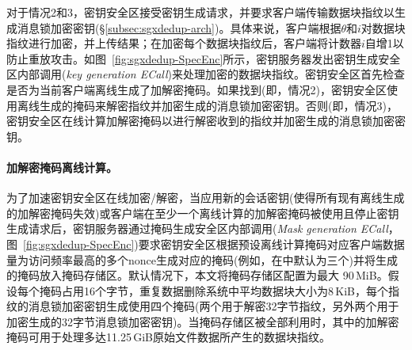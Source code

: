 对于情况2和3，密钥安全区接受密钥生成请求，并要求客户端传输数据块指纹以生成消息锁加密密钥(\S\ref{subsec:sgxdedup-arch})。具体来说，客户端根据$\theta$和$i$对数据块指纹进行加密，并上​​传结果；在加密每个数据块指纹后，客户端将计数器$i$自增1以防止重放攻击。如图~\ref{fig:sgxdedup-SpecEnc}所示，密钥服务器发出密钥生成安全区内部调用(\textit{key generation ECall})来处理加密的数据块指纹。密钥安全区首先检查是否为当前客户端离线生成了加解密掩码。如果找到(即，情况2)，密钥安全区使用离线生成的掩码来解密指纹并加密生成的消息锁加密密钥。否则(即，情况3)，密钥安全区在线计算加解密掩码以进行解密收到的指纹并加密生成的消息锁加密密钥。

\paragraph*{加解密掩码离线计算。}为了加速密钥安全区在线加密/解密，当应用新的会话密钥(使得所有现有离线生成的加解密掩码失效)或客户端在至少一个离线计算的加解密掩码被使用且停止密钥生成请求后，密钥服务器通过掩码生成安全区内部调用(\textit{Mask generation ECall}，图~\ref{fig:sgxdedup-SpecEnc})要求密钥安全区根据预设离线计算掩码对应客户端数据量为访问频率最高的多个nonce生成对应的掩码(例如，在\sysnameS 中默认为三个)并将生成的掩码放入掩码存储区。默认情况下，本文将掩码存储区配置为最大 90\,MiB。假设每个掩码占用16个字节，重复数据删除系统中平均数据块大小为8\,KiB，每个指纹的消息锁加密密钥生成使用四个掩码(两个用于解密32字节指纹，另外两个用于加密生成的32字节消息锁加密密钥)。当掩码存储区被全部利用时，其中的加解密掩码可用于处理多达11.25\,GiB原始文件数据所产生的数据块指纹。
